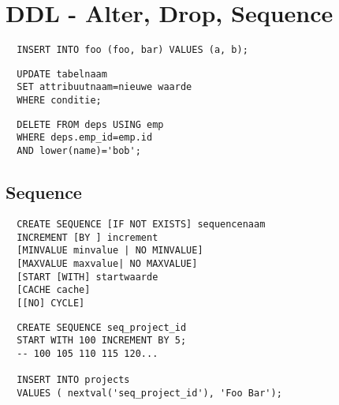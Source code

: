 \section{DDL - Alter, Drop, Sequence}


\begin{tiny}
\begin{lstlisting}
  INSERT INTO foo (foo, bar) VALUES (a, b);
\end{lstlisting}

\begin{lstlisting}
  UPDATE tabelnaam
  SET attribuutnaam=nieuwe waarde
  WHERE conditie;
\end{lstlisting}

\begin{lstlisting}
  DELETE FROM deps USING emp
  WHERE deps.emp_id=emp.id
  AND lower(name)='bob';
\end{lstlisting}
\end{tiny}

\subsection{Sequence}

\begin{tiny}
\begin{lstlisting}
  CREATE SEQUENCE [IF NOT EXISTS] sequencenaam
  INCREMENT [BY ] increment
  [MINVALUE minvalue | NO MINVALUE]
  [MAXVALUE maxvalue| NO MAXVALUE]
  [START [WITH] startwaarde
  [CACHE cache]
  [[NO] CYCLE]
\end{lstlisting}

\begin{lstlisting}
  CREATE SEQUENCE seq_project_id
  START WITH 100 INCREMENT BY 5;
  -- 100 105 110 115 120...

  INSERT INTO projects
  VALUES ( nextval('seq_project_id'), 'Foo Bar');
\end{lstlisting}
\end{tiny}